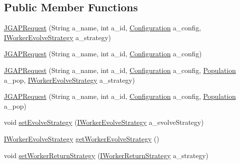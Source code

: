 \subsection*{Public Member Functions}
\begin{DoxyCompactItemize}
\item 
\hyperlink{classorg_1_1jgap_1_1distr_1_1grid_1_1_j_g_a_p_request_a72056d13e6df94064ac0484a58f51f36}{J\-G\-A\-P\-Request} (String a\-\_\-name, int a\-\_\-id, \hyperlink{classorg_1_1jgap_1_1_configuration}{Configuration} a\-\_\-config, \hyperlink{interfaceorg_1_1jgap_1_1distr_1_1grid_1_1_i_worker_evolve_strategy}{I\-Worker\-Evolve\-Strategy} a\-\_\-strategy)
\item 
\hyperlink{classorg_1_1jgap_1_1distr_1_1grid_1_1_j_g_a_p_request_a1733c99d610baf7b1f578aea248013a8}{J\-G\-A\-P\-Request} (String a\-\_\-name, int a\-\_\-id, \hyperlink{classorg_1_1jgap_1_1_configuration}{Configuration} a\-\_\-config)
\item 
\hyperlink{classorg_1_1jgap_1_1distr_1_1grid_1_1_j_g_a_p_request_a865df734104aede647a61798becc02db}{J\-G\-A\-P\-Request} (String a\-\_\-name, int a\-\_\-id, \hyperlink{classorg_1_1jgap_1_1_configuration}{Configuration} a\-\_\-config, \hyperlink{classorg_1_1jgap_1_1_population}{Population} a\-\_\-pop, \hyperlink{interfaceorg_1_1jgap_1_1distr_1_1grid_1_1_i_worker_evolve_strategy}{I\-Worker\-Evolve\-Strategy} a\-\_\-strategy)
\item 
\hyperlink{classorg_1_1jgap_1_1distr_1_1grid_1_1_j_g_a_p_request_a9499a526f1488588fe22e5c0a66f921e}{J\-G\-A\-P\-Request} (String a\-\_\-name, int a\-\_\-id, \hyperlink{classorg_1_1jgap_1_1_configuration}{Configuration} a\-\_\-config, \hyperlink{classorg_1_1jgap_1_1_population}{Population} a\-\_\-pop)
\item 
void \hyperlink{classorg_1_1jgap_1_1distr_1_1grid_1_1_j_g_a_p_request_a001a9f1acca68ef371028e1b68109736}{set\-Evolve\-Strategy} (\hyperlink{interfaceorg_1_1jgap_1_1distr_1_1grid_1_1_i_worker_evolve_strategy}{I\-Worker\-Evolve\-Strategy} a\-\_\-evolve\-Strategy)
\item 
\hyperlink{interfaceorg_1_1jgap_1_1distr_1_1grid_1_1_i_worker_evolve_strategy}{I\-Worker\-Evolve\-Strategy} \hyperlink{classorg_1_1jgap_1_1distr_1_1grid_1_1_j_g_a_p_request_ad98a88f8d16636f65d84f46dd9e85793}{get\-Worker\-Evolve\-Strategy} ()
\item 
void \hyperlink{classorg_1_1jgap_1_1distr_1_1grid_1_1_j_g_a_p_request_a92f14520ec7f8f840490dc359deeefb1}{set\-Worker\-Return\-Strategy} (\hyperlink{interfaceorg_1_1jgap_1_1distr_1_1grid_1_1_i_worker_return_strategy}{I\-Worker\-Return\-Strategy} a\-\_\-strategy)

\end{DoxyCompactItemize}
